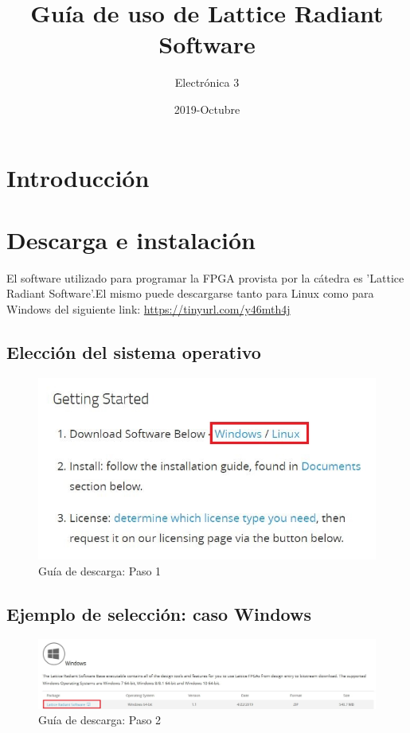 \documentclass{article}
\title{Guía de uso de Lattice Radiant Software}
\date{2019-Octubre}
\author{Electrónica 3}
\begin{document}
\maketitle
{}
\newpage
{}

\tableofcontents
\pagebreak

\section{Introducción}

\section{Descarga e instalación}
El software utilizado para programar la FPGA provista por la cátedra es 'Lattice Radiant Software'.El mismo puede descargarse tanto para Linux como para Windows del siguiente link: \url{https://tinyurl.com/y46mth4j}
\subsection{ Elección del sistema operativo}

\begin{figure}[H]
\centering
\includegraphics[width=0.4\linewidth]{Imagenes/1.JPG}
\caption{Guía de descarga: Paso 1}
\label{fig:step1}
\end{figure}


\subsection{ Ejemplo de selección: caso Windows}

\begin{figure}[H]
\centering
\includegraphics[width=1\linewidth]{Imagenes/2.JPG}
\caption{Guía de descarga: Paso 2}
\label{fig:step2}
\end{figure}
\end{document}
